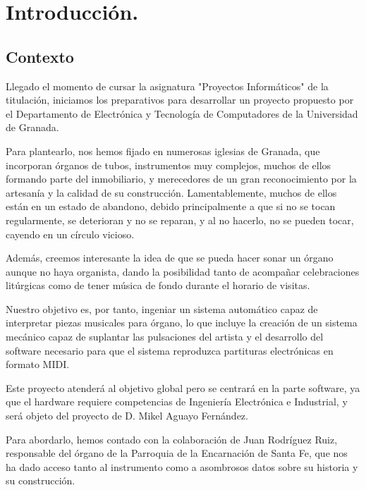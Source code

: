 \chapter{Introducción.}
\label{cap:capitulo_1}

\section{Contexto}

Llegado el momento de cursar la asignatura "Proyectos Informáticos" de la titulación, iniciamos los preparativos para desarrollar un proyecto propuesto por el Departamento de Electrónica y Tecnología de Computadores de la Universidad de Granada.

Para plantearlo, nos hemos fijado en numerosas iglesias de Granada, que incorporan órganos de tubos, instrumentos muy complejos, muchos de ellos formando parte del inmobiliario, y merecedores de un gran reconocimiento por la artesanía y la calidad de su construcción. Lamentablemente, muchos de ellos están en un estado de abandono, debido principalmente a que si no se tocan regularmente, se deterioran y no se reparan, y al no hacerlo, no se pueden tocar, cayendo en un círculo vicioso.

Además, creemos interesante la idea de que se pueda hacer sonar un órgano aunque no haya organista, dando la posibilidad tanto de acompañar celebraciones litúrgicas como de tener música de fondo durante el horario de visitas.

Nuestro objetivo es, por tanto, ingeniar un sistema automático capaz de interpretar piezas musicales para órgano, lo que incluye la creación de un sistema mecánico capaz de suplantar las pulsaciones del artista y el desarrollo del software necesario para que el sistema reproduzca partituras electrónicas en formato MIDI.

\newpage

Este proyecto atenderá al objetivo global pero se centrará en la parte software, ya que el hardware requiere competencias de Ingeniería Electrónica e Industrial, y será objeto del proyecto de D. Mikel Aguayo Fernández.

Para abordarlo, hemos contado con la colaboración de Juan Rodríguez Ruiz, responsable del órgano de la Parroquia de la Encarnación de Santa Fe, que nos ha dado acceso tanto al instrumento como a asombrosos datos sobre su historia y su construcción.

\smallskip

